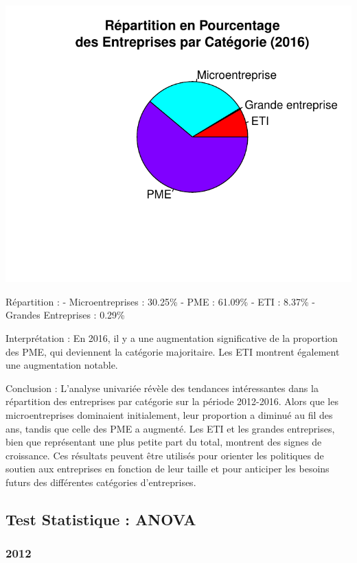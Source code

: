 \documentclass[mstat,12pt]{unswthesis}
\begin{document}
\includegraphics{TDDT_projet_L_2_files/figure-latex/analyse_univariee_2016-1.pdf}

Répartition : - Microentreprises : 30.25\% - PME : 61.09\% - ETI :
8.37\% - Grandes Entreprises : 0.29\%

\medskip

Interprétation : En 2016, il y a une augmentation significative de la
proportion des PME, qui deviennent la catégorie majoritaire. Les ETI
montrent également une augmentation notable.

\medskip

Conclusion : L'analyse univariée révèle des tendances intéressantes dans
la répartition des entreprises par catégorie sur la période 2012-2016.
Alors que les microentreprises dominaient initialement, leur proportion
a diminué au fil des ans, tandis que celle des PME a augmenté. Les ETI
et les grandes entreprises, bien que représentant une plus petite part
du total, montrent des signes de croissance. Ces résultats peuvent être
utilisés pour orienter les politiques de soutien aux entreprises en
fonction de leur taille et pour anticiper les besoins futurs des
différentes catégories d'entreprises.

\newpage

\subsection{Test Statistique : ANOVA}\label{test-statistique-anova}

\medskip

\subsubsection{\texorpdfstring{\textbf{2012}}{2012}}\label{section}
\end{document}
